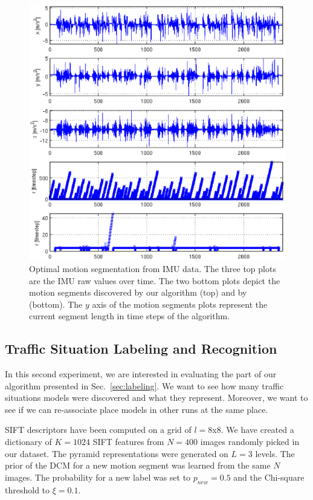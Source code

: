\begin{figure}[t]
\centering
\includegraphics[width=\columnwidth]{fig/cpDetect.eps}
\caption{Optimal motion segmentation from IMU data. The three top plots are the
  IMU raw values over time. The two bottom plots depict the motion segments
  discovered by our algorithm (top) and by \cite{ranganathan10pliss} (bottom).
  The $y$ axis of the motion segments plots represent the current segment
  length in time steps of the algorithm.}
\label{fig:motion_segments}
\end{figure}

\subsection{Traffic Situation Labeling and Recognition}
In this second experiment, we are interested in evaluating the part of our
algorithm presented in Sec.~\ref{sec:labeling}. We want to see how many traffic
situations models were discovered and what they represent. Moreover, we want
to see if we can re-associate place models in other runs at the same place.

SIFT descriptors have been computed on a grid of $l=8$x$8$. We have created a
dictionary of $K=1024$ SIFT features from $N=400$ images randomly picked in our
dataset. The pyramid representations were generated on $L=3$ levels. The prior
of the DCM for a new motion segment was learned from the same $N$ images. The
probability for a new label was set to $p_{new}=0.5$ and the Chi-square
threshold to $\xi=0.1$.

